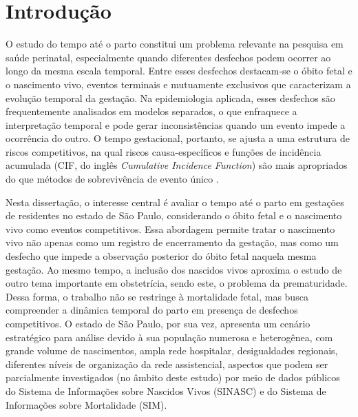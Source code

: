 %

\chapter{Introdução}

O estudo do tempo até o parto constitui um problema relevante na pesquisa em saúde 
perinatal, especialmente quando diferentes desfechos podem ocorrer ao longo da mesma 
escala temporal. Entre esses desfechos destacam-se o óbito fetal e o nascimento vivo, 
eventos terminais e mutuamente exclusivos que caracterizam a evolução temporal da 
gestação. Na epidemiologia aplicada, esses desfechos são frequentemente analisados 
em modelos separados, o que enfraquece a interpretação temporal e pode gerar 
inconsistências quando um evento impede a ocorrência do outro. O tempo gestacional, 
portanto, se ajusta a uma estrutura de riscos competitivos, na qual riscos 
causa-específicos e funções de incidência acumulada (CIF, do inglês 
\textit{Cumulative Incidence Function}) são mais apropriados do que métodos 
de sobrevivência de evento único \cite{satagopan2004note,finegray1999,
naimi2016cumulative,smith2016competing}.

Nesta dissertação, o interesse central é avaliar o tempo até o parto em
gestações de residentes no estado de São Paulo, considerando o óbito fetal e o
nascimento vivo como eventos competitivos. Essa abordagem permite tratar o nascimento 
vivo não apenas como um registro de encerramento da gestação, mas como um desfecho 
que impede a observação posterior do óbito fetal naquela mesma gestação. Ao mesmo 
tempo, a inclusão dos nascidos vivos aproxima o estudo de outro tema importante 
em obstetrícia, sendo este, o problema da prematuridade. Dessa forma, o trabalho 
não se restringe à mortalidade fetal, mas busca compreender a dinâmica temporal 
do parto em presença de desfechos competitivos. O estado de São Paulo, por sua vez, 
apresenta um cenário estratégico para análise devido à sua população numerosa e 
heterogênea, com grande volume de nascimentos, ampla rede hospitalar, desigualdades 
regionais, diferentes níveis de organização da rede assistencial, aspectos que 
podem ser parcialmente investigados (no âmbito deste estudo) por meio de dados 
públicos do Sistema de Informações sobre Nascidos Vivos (SINASC) e do Sistema de 
Informações sobre Mortalidade (SIM).

